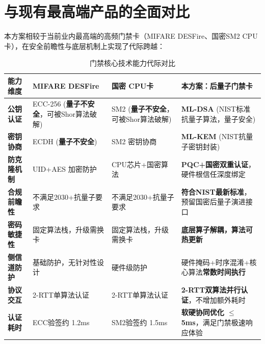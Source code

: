 \section{与现有最高端产品的全面对比}

本方案相较于当前业内最高端的高频门禁卡（MIFARE DESFire、国密SM2 CPU卡），在安全前瞻性与底层机制上实现了代际跨越：

\begin{table}[htbp]
	\centering
	\caption{门禁核心技术能力代际对比}
	\label{tab:comparison}
	\renewcommand{\arraystretch}{1.3}
	\small
	\begin{tabular}{p{2cm}p{3.5cm}p{3.5cm}p{5cm}}
		\toprule
		\textbf{能力维度} & \textbf{MIFARE DESFire} & \textbf{国密 CPU卡} & \textbf{本方案：后量子门禁卡} \\
		\midrule
		\textbf{公钥认证} & ECC-256 (\textbf{量子不安全}，可被Shor算法破解) & SM2 (\textbf{量子不安全}，可被Shor算法破解) & \textbf{ML-DSA} (NIST标准抗量子算法，量子安全) \\
		\textbf{密钥协商} & ECDH (\textbf{量子不安全}) & SM2 密钥协商 & \textbf{ML-KEM} (NIST抗量子密钥封装) \\
		\textbf{防克隆机制} & UID+AES 加密防护 & CPU芯片+国密算法 & \textbf{PQC+国密双重认证}，硬件根信任深度绑定 \\
		\textbf{合规前瞻性} & 不满足2030+抗量子要求 & 不满足2030+抗量子要求 & \textbf{符合NIST最新标准}，预留国密后量子演进接口 \\
		\textbf{密码敏捷性} & 固定算法栈，升级需换卡 & 固定算法栈，升级需换卡 & \textbf{底层算子解耦，算法可热更新} \\
		\textbf{侧信道防护} & 基础防护，无针对性设计 & 硬件级防护 & 硬件掩码+时序混淆+核心算法\textbf{常数时间执行} \\
		\textbf{协议交互} & 2-RTT单算法认证 & 2-RTT单算法认证 & \textbf{2-RTT双算法并行认证}，不增加额外耗时 \\
		\textbf{认证耗时} & ECC验签约 1.2ms & SM2验签约 1.5ms & \textbf{软硬协同优化 $\le$ 5ms}，满足门禁极速响应体验 \\
		\bottomrule
	\end{tabular}
\end{table}
